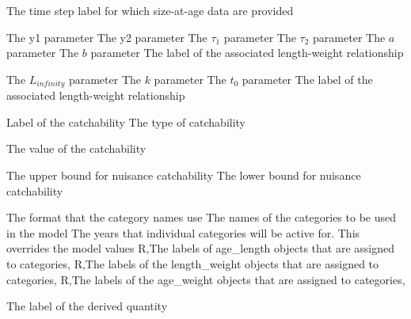  {The time step label for which size-at-age data are provided}
\par\textbf{}\par
\par\textbf{}\par
{} {The y1 parameter}
 {The y2 parameter}
 {The $\tau_1$ parameter}
 {The $\tau_2$ parameter}
 {The $a$ parameter}
 {The $b$ parameter}
 {The label of the associated length-weight relationship}
\par\textbf{}\par
{} {The $L_{infinity}$ parameter}
 {The $k$ parameter}
 {The $t_0$ parameter}
 {The label of the associated length-weight relationship}
\par\par
{} {Label of the catchability}
 {The type of catchability}
\par\textbf{}\par
{} {The value of the catchability}
\par\textbf{}\par
{} {The upper bound for nuisance catchability}
 {The lower bound for nuisance catchability}
 {}
\par\par
{} {The format that the category names use}
 {The names of the categories to be used in the model}
 {The years that individual categories will be active for. This overrides the model values}
 {R,The labels of age\_length objects that are assigned to categories,}
 {R,The labels of the length\_weight objects that are assigned to categories,}
 {R,The labels of the age\_weight objects that are assigned to categories,}
\par\par
{} {The label of the derived quantity}
